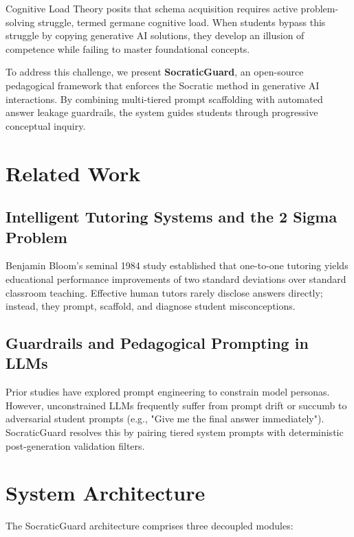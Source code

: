 \documentclass[conference]{IEEEtran}
\begin{document}
Cognitive Load Theory posits that schema acquisition requires active problem-solving struggle, termed germane cognitive load. When students bypass this struggle by copying generative AI solutions, they develop an illusion of competence while failing to master foundational concepts.

To address this challenge, we present \textbf{SocraticGuard}, an open-source pedagogical framework that enforces the Socratic method in generative AI interactions. By combining multi-tiered prompt scaffolding with automated answer leakage guardrails, the system guides students through progressive conceptual inquiry.

\section{Related Work}
\subsection{Intelligent Tutoring Systems and the 2 Sigma Problem}
Benjamin Bloom's seminal 1984 study established that one-to-one tutoring yields educational performance improvements of two standard deviations over standard classroom teaching. Effective human tutors rarely disclose answers directly; instead, they prompt, scaffold, and diagnose student misconceptions.

\subsection{Guardrails and Pedagogical Prompting in LLMs}
Prior studies have explored prompt engineering to constrain model personas. However, unconstrained LLMs frequently suffer from prompt drift or succumb to adversarial student prompts (e.g., "Give me the final answer immediately"). SocraticGuard resolves this by pairing tiered system prompts with deterministic post-generation validation filters.

\section{System Architecture}
The SocraticGuard architecture comprises three decoupled modules:
\end{document}
